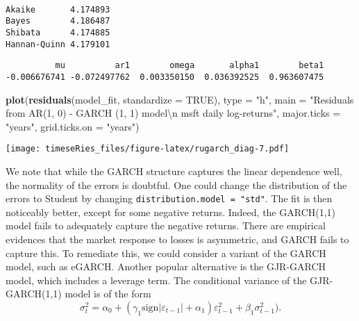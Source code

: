 \documentclass[]{book}
\newenvironment{Shaded}{\begin{snugshade}}{\end{snugshade}}
\newcommand{\KeywordTok}[1]{\textcolor[rgb]{0.13,0.29,0.53}{\textbf{#1}}}
\newcommand{\DataTypeTok}[1]{\textcolor[rgb]{0.13,0.29,0.53}{#1}}
\newcommand{\CharTok}[1]{\textcolor[rgb]{0.31,0.60,0.02}{#1}}
\newcommand{\StringTok}[1]{\textcolor[rgb]{0.31,0.60,0.02}{#1}}
\newcommand{\OtherTok}[1]{\textcolor[rgb]{0.56,0.35,0.01}{#1}}
\newcommand{\OperatorTok}[1]{\textcolor[rgb]{0.81,0.36,0.00}{\textbf{#1}}}
\newcommand{\NormalTok}[1]{#1}
\begin{document}
\begin{verbatim}
                     
Akaike       4.174893
Bayes        4.186487
Shibata      4.174885
Hannan-Quinn 4.179101
\end{verbatim}

\begin{Shaded}
\end{Shaded}

\begin{verbatim}
          mu          ar1        omega       alpha1        beta1 
-0.006676741 -0.072497762  0.003350150  0.036392525  0.963607475 
\end{verbatim}

\begin{Shaded}
\begin{Highlighting}[]
\KeywordTok{plot}\NormalTok{(}\KeywordTok{residuals}\NormalTok{(model_fit, }\DataTypeTok{standardize =} \OtherTok{TRUE}\NormalTok{), }\DataTypeTok{type =} \StringTok{"h"}\NormalTok{, }\DataTypeTok{main =} \StringTok{"Residuals from AR(1, 0) - GARCH (1, 1) model}\CharTok{\textbackslash{}n}\StringTok{ msft daily log-returns"}\NormalTok{, }
    \DataTypeTok{major.ticks =} \StringTok{"years"}\NormalTok{, }\DataTypeTok{grid.ticks.on =} \StringTok{"years"}\NormalTok{)}
\end{Highlighting}
\end{Shaded}

\texttt{[image: timeseRies\_files/figure-latex/rugarch\_diag-7.pdf]}

We note that while the GARCH structure captures the linear dependence
well, the normality of the errors is doubtful. One could change the
distribution of the errors to Student by changing
\texttt{distribution.model\ =\ "std"}. The fit is then noticeably
better, except for some negative returns. Indeed, the GARCH(1,1) model
fails to adequately capture the negative returns. There are empirical
evidences that the market response to losses is asymmetric, and GARCH
fails to capture this. To remediate this, we could consider a variant of
the GARCH model, such as eGARCH. Another popular alternative is the
GJR-GARCH model, which includes a leverage term. The conditional
variance of the GJR-GARCH(1,1) model is of the form
\[\sigma^2_t = \alpha_0+(\gamma_1\mathrm{sign}|\varepsilon_{t-1}|+\alpha_1)\varepsilon_{t-1}^2+\beta_1\sigma^2_{t-1}).\]
\end{document}

